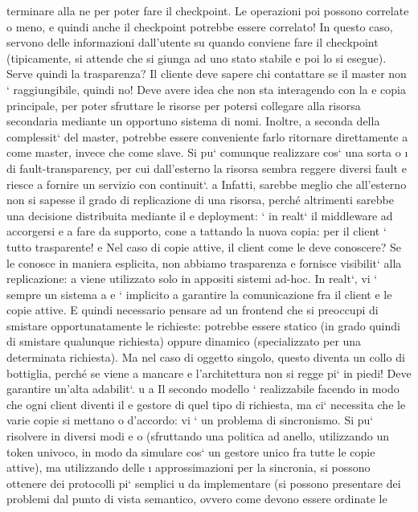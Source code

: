 \documentclass[a4paper,12pt]{article}
\begin{document}
terminare alla ne per poter fare il checkpoint.
Le operazioni poi possono correlate o meno, e quindi anche il checkpoint
potrebbe essere correlato! In questo caso, servono delle informazioni dall'utente
su quando conviene fare il checkpoint (tipicamente, si attende che si giunga ad
uno stato stabile e poi lo si esegue).
Serve quindi la trasparenza? Il cliente deve sapere chi contattare se il master
non ` raggiungibile, quindi no! Deve avere idea che non sta interagendo con la
e
copia principale, per poter sfruttare le risorse per potersi collegare alla risorsa
secondaria mediante un opportuno sistema di nomi. Inoltre, a seconda della
complessit` del master, potrebbe essere conveniente farlo ritornare direttamente
a
come master, invece che come slave. Si pu` comunque realizzare cos` una sorta
o
\i{}
di fault-transparency, per cui dall'esterno la risorsa sembra reggere diversi fault
e riesce a fornire un servizio con continuit`.
a
Infatti, sarebbe meglio che all'esterno non si sapesse il grado di replicazione
di una risorsa, perché altrimenti sarebbe una decisione distribuita mediante il
e
deployment: ` in realt` il middleware ad accorgersi e a fare da supporto, cone
a
tattando la nuova copia: per il client ` tutto trasparente!
e
Nel caso di copie attive, il client come le deve conoscere? Se le conosce in
maniera esplicita, non abbiamo trasparenza e fornisce visibilit` alla replicazione:
a
viene utilizzato solo in appositi sistemi ad-hoc. In realt`, vi ` sempre un sistema
a
e
`
implicito a garantire la comunicazione fra il client e le copie attive. E quindi necessario pensare ad un frontend che
si preoccupi di smistare opportunatamente le
richieste: potrebbe essere statico (in grado quindi di smistare qualunque richiesta) oppure dinamico (specializzato per
una determinata richiesta). Ma nel caso
di oggetto singolo, questo diventa un collo di bottiglia, perché se viene a mancare
e
l'architettura non si regge pi` in piedi! Deve garantire un'alta adabilit`.
u
a
Il secondo modello ` realizzabile facendo in modo che ogni client diventi il
e
gestore di quel tipo di richiesta, ma ci` necessita che le varie copie si mettano
o
d'accordo: vi ` un problema di sincronismo. Si pu` risolvere in diversi modi
e
o
(sfruttando una politica ad anello, utilizzando un token univoco, in modo da
simulare cos` un gestore unico fra tutte le copie attive), ma utilizzando delle
\i{}
approssimazioni per la sincronia, si possono ottenere dei protocolli pi` semplici
u
da implementare (si possono presentare dei problemi dal punto di vista semantico, ovvero come devono essere ordinate le
\end{document}
